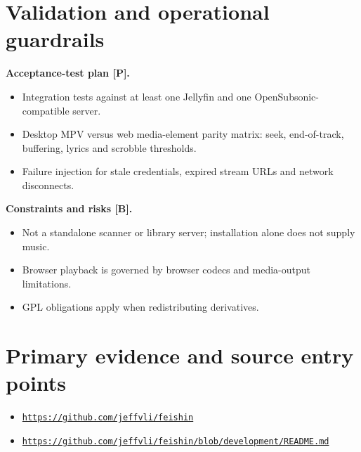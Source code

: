 \documentclass[10pt,a4paper,oneside]{report}
\newcommand{\sourceurl}[1]{\href{#1}{\texttt{\nolinkurl{#1}}}}
\begin{document}
\section{Validation and operational guardrails}
\textbf{Acceptance-test plan [P].}\par
\begin{itemize}[leftmargin=*,itemsep=2pt,topsep=3pt]
\item Integration tests against at least one Jellyfin and one OpenSubsonic-compatible server.
\item Desktop MPV versus web media-element parity matrix: seek, end-of-track, buffering, lyrics and scrobble thresholds.
\item Failure injection for stale credentials, expired stream URLs and network disconnects.
\end{itemize}
\textbf{Constraints and risks [B].}\par
\begin{itemize}[leftmargin=*,itemsep=2pt,topsep=3pt]
\item Not a standalone scanner or library server; installation alone does not supply music.
\item Browser playback is governed by browser codecs and media-output limitations.
\item GPL obligations apply when redistributing derivatives.
\end{itemize}
\section*{Primary evidence and source entry points}
\begin{itemize}[leftmargin=*,itemsep=1pt,topsep=1pt]
\item \sourceurl{https://github.com/jeffvli/feishin}
\item \sourceurl{https://github.com/jeffvli/feishin/blob/development/README.md}
\end{itemize}
\clearpage
\end{document}
